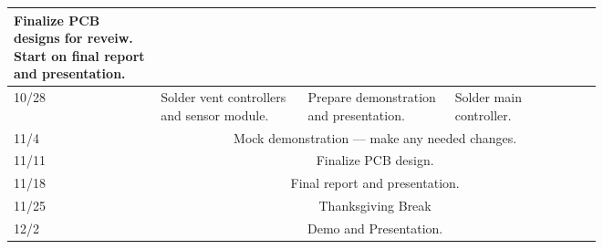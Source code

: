 \begin{tabular}{|l|p{0.25\linewidth}|p{0.25\linewidth}|p{0.25\linewidth}|}
        {\raggedright
        Finalize PCB \\ designs for reveiw. \newline
        Start on final report and presentation.} \\
\hline
10/28 & \raggedright
        Solder vent controllers and sensor module. &
        \raggedright
        Prepare demonstration and presentation. &
        {\raggedright
        Solder main \\controller.} \\
\hline
11/4  & \multicolumn{3}{|c|}{Mock demonstration --- make any needed changes.}\\
\hline
11/11 & \multicolumn{3}{|c|}{Finalize PCB design.}\\
\hline
11/18 & \multicolumn{3}{|c|}{Final report and presentation.}\\
\hline
11/25 & \multicolumn{3}{|c|}{Thanksgiving Break}\\
\hline
12/2  & \multicolumn{3}{|c|}{Demo and Presentation.}\\
\hline
\end{tabular}


